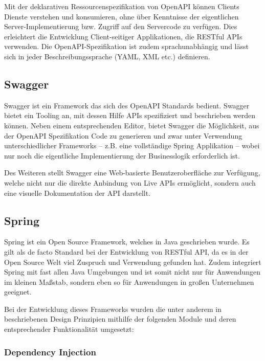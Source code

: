 			Mit der deklarativen Ressourcenspezifikation von OpenAPI können Clients Dienste verstehen und konsumieren, ohne über Kenntnisse der eigentlichen Server-Implementierung bzw. Zugriff auf den Servercode zu verfügen. Dies erleichtert die Entwicklung Client-seitiger Applikationen, die RESTful APIs verwenden. Die OpenAPI-Spezifikation ist zudem sprachunabhängig und lässt sich in jeder Beschreibungssprache (YAML, XML etc.) definieren. 
	
		\subsection{Swagger} %
		
			Swagger ist ein Framework das sich des OpenAPI Standards bedient. Swagger bietet ein Tooling an, mit dessen Hilfe APIs spezifiziert und beschrieben werden können. Neben einem entsprechenden Editor, bietet Swagger die Möglichkeit, aus der OpenAPI Spezifikation Code zu generieren und zwar unter Verwendung unterschiedlicher Frameworks -- z.B. eine vollständige Spring Applikation -- wobei nur noch die eigentliche Implementierung der Businesslogik erforderlich ist.
			
			Des Weiteren stellt Swagger eine Web-basierte Benutzeroberfläche zur Verfügung, welche nicht nur die direkte Anbindung von Live APIs ermöglicht, sondern auch eine visuelle Dokumentation der API darstellt. \cite{SmartBear.2020}
	
		\subsection{Spring} %
		
			Spring ist ein Open Source Framework, welches in Java geschrieben wurde. Es gilt als de facto Standard bei der Entwicklung von RESTful API, da es in der Open Source Welt viel Zuspruch und Verwendung gefunden hat. Zudem integriert Spring mit fast allen Java Umgebungen und ist somit nicht nur für Anwendungen im kleinen Maßstab, sondern eben so für Anwendungen in großen Unternehmen geeignet. \cite{Walls.20162017} 
			
			Bei der Entwicklung dieses Frameworks wurden die unter anderem in \cite{Johnson.2003} beschriebenen Design Prinzipien mithilfe der folgenden Module und deren entsprechender Funktionalität umgesetzt:
			
			\subsubsection{Dependency Injection} %
			
